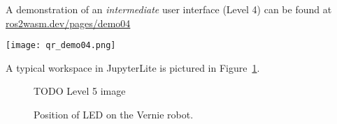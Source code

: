         \begin{tcolorbox}[title=Example 4]
            \begin{minipage}[t]{0.87\linewidth}
                \vspace*{0.5\baselineskip}
                A demonstration of an \textit{intermediate} user interface (Level 4) can
                be found at \href{https://ros2wasm.dev/pages/demo04/index.html}{\textsf{ros2wasm.dev/pages/demo04}}
            \end{minipage}\hfill%
            \begin{minipage}[t]{0.1\linewidth}
                \vspace*{0pt}
                \texttt{[image: qr\_demo04.png]}
            \end{minipage}
        \end{tcolorbox}

        A typical workspace in JupyterLite is pictured in Figure~\ref{fig:ui5}.

        \begin{figure}[htbp]
            \centering
            \caption{TODO Level 5 image}\label{fig:ui5}
        \end{figure}




    \begin{figure}
        \centering

        \caption{Position of \ac{LED} on the Vernie robot.}
        \label{fig:vernie}
    \end{figure}
    
